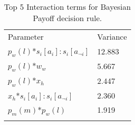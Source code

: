 \begin{table}[H]
\caption{Top 5 Interaction terms for Bayesian Payoff decision rule. \label{tab:sa_interaction_payoff_group_iqr}}
\begin{tabular} {ll}
\hline\noalign{\smallskip}
Parameter & Variance \\
\noalign{\smallskip}\svhline\noalign{\smallskip}
\(p_{w}(l)\)*\(s_{i}[a_{i}]:s_{i}[a_{\neg i}]\) & 12.883\\
\(p_{w}(l)\)*\(w_{w}\) & 5.667\\
\(p_{w}(l)\)*\(x_{h}\) & 2.447\\
\(x_{h}\)*\(s_{i}[a_{i}]:s_{i}[a_{\neg i}]\) & 2.360\\
\(p_{m}(m)\)*\(p_{w}(l)\) & 1.919\\ 
\noalign{\smallskip}\hline\noalign{\smallskip}
\end{tabular}
\end{table}

